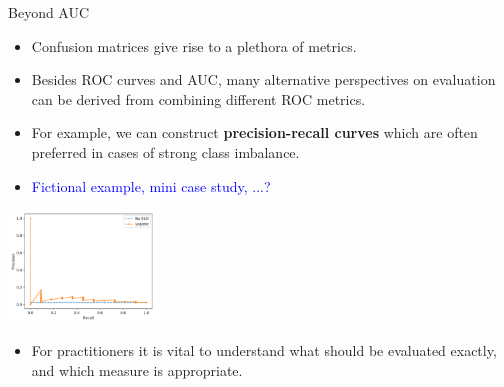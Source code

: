 \documentclass[11pt,compress,t,notes=noshow, xcolor=table]{beamer}
\begin{document}
\begin{vbframe}{Beyond AUC}

\begin{itemize}
  \item Confusion matrices give rise to a plethora of metrics.
  \item Besides ROC curves and AUC, many alternative perspectives on evaluation 
  can be derived from combining different ROC metrics.
  \item For example, we can construct \textbf{precision-recall curves} which are 
  often preferred in cases of strong class imbalance.
  \item \textcolor{blue}{Fictional example, mini case study, ...?}
\end{itemize} 

\centering 
\includegraphics[width=0.3\textwidth]{figure_man/placeholder_precision_recall} 

\begin{itemize}
  \item For practitioners it is vital to understand what should be 
  evaluated exactly, and which measure is appropriate.  
\end{itemize}

\end{vbframe}




\endlecture
\end{document}
